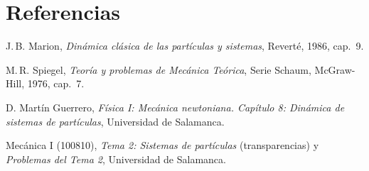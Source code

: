 \section{Referencias}
\label{sec:referencias}

\begin{enumerate}[label={\textcolor{cian}{[\arabic*]}},leftmargin=2.2em,itemsep=1ex]
  \item J.\,B. Marion, \emph{Dinámica clásica de las partículas y sistemas},
        Reverté, 1986, cap.~9.
  \item M.\,R. Spiegel, \emph{Teoría y problemas de Mecánica Teórica},
        Serie Schaum, McGraw-Hill, 1976, cap.~7.
  \item D. Martín Guerrero, \emph{Física I: Mecánica newtoniana. Capítulo 8:
        Dinámica de sistemas de partículas}, Universidad de Salamanca.
  \item Mecánica I (100810), \emph{Tema 2: Sistemas de partículas}
        (transparencias) y \emph{Problemas del Tema 2}, Universidad de Salamanca.
\end{enumerate}
